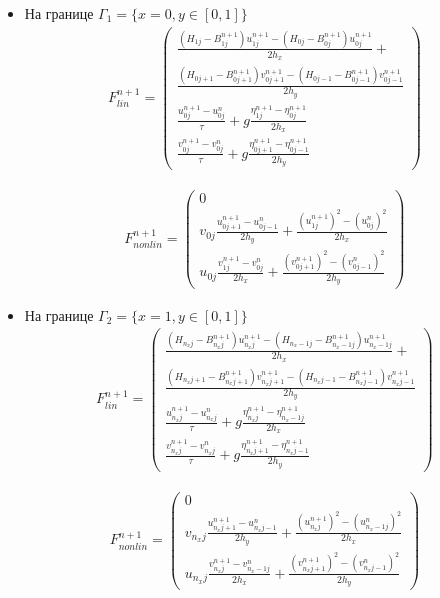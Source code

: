 \begin{itemize}

    \item На границе $\Gamma_1=\{x=0,y\in[0,1]\}$
	\begin{eqnarray}
	    \label{eq:ApproxFLinGamma1}
	    F^{n+1}_{lin}=\begin{pmatrix}
		\frac{(H_{1j}-B_{1j}^{n+1})u_{1j}^{n+1}-(H_{0j}-B_{0j}^{n+1})u_{0j}^{n+1}}{2h_x}+\\
		\frac{(H_{0j+1}-B_{0j+1}^{n+1})v_{0j+1}^{n+1}-(H_{0j-1}-B_{0j-1}^{n+1})v_{0j-1}^{n+1}}{2h_y}\\
		\frac{u_{0j}^{n+1}-u_{0j}^{n}}{\tau}+
		g\frac{\eta_{1j}^{n+1}-\eta_{0j}^{n+1}}{2h_x}\\
		\frac{v_{0j}^{n+1}-v_{0j}^{n}}{\tau}+
		g\frac{\eta_{0j+1}^{n+1}-\eta_{0j-1}^{n+1}}{2h_y}
	    \end{pmatrix}
	\end{eqnarray}

	\begin{eqnarray}
	    \label{eq:ApproxFNonlinGamma1}
	    F^{n+1}_{nonlin}=\begin{pmatrix}
		0\\
		v_{0j}\frac{u_{0j+1}^{n+1}-u_{0j-1}^{n}}{2h_y}+
		\frac{(u_{1j}^{n+1})^2-(u_{0j}^{n})^2}{2h_x}\\
		u_{0j}\frac{v_{1j}^{n+1}-v_{0j}^{n}}{2h_x}+
		\frac{(v_{0j+1}^{n+1})^2-(v_{0j-1}^{n})^2}{2h_y}
	    \end{pmatrix}
	\end{eqnarray}

    \item На границе $\Gamma_2=\{x=1,y\in[0,1]\}$
	\begin{eqnarray}
	    \label{eq:ApproxFLinGamma2}
	    F^{n+1}_{lin}=\begin{pmatrix}
		\frac{(H_{n_{x}j}-B_{n_{x}j}^{n+1})u_{n_{x}j}^{n+1}-(H_{n_{x}-1j}-B_{n_{x}-1j}^{n+1})u_{n_{x}-1j}^{n+1}}{2h_x}+\\
		\frac{(H_{n_{x}j+1}-B_{n_{x}j+1}^{n+1})v_{n_{x}j+1}^{n+1}-(H_{n_{x}j-1}-B_{n_{x}j-1}^{n+1})v_{n_{x}j-1}^{n+1}}{2h_y}\\
		\frac{u_{n_{x}j}^{n+1}-u_{n_{x}j}^{n}}{\tau}+
		g\frac{\eta_{n_{x}j}^{n+1}-\eta_{n_{x}-1j}^{n+1}}{2h_x}\\
		\frac{v_{n_{x}j}^{n+1}-v_{n_{x}j}^{n}}{\tau}+
		g\frac{\eta_{n_{x}j+1}^{n+1}-\eta_{n_{x}j-1}^{n+1}}{2h_y}
	    \end{pmatrix}
	\end{eqnarray}

	\begin{eqnarray}
	    \label{eq:ApproxFNonlinGamma2}
	    F^{n+1}_{nonlin}=\begin{pmatrix}
		0\\
		v_{n_{x}j}\frac{u_{n_{x}j+1}^{n+1}-u_{n_{x}j-1}^{n}}{2h_y}+
		\frac{(u_{n_{x}j}^{n+1})^2-(u_{n_{x}-1j}^{n})^2}{2h_x}\\
		u_{n_{x}j}\frac{v_{n_{x}j}^{n+1}-v_{n_{x}-1j}^{n}}{2h_x}+
		\frac{(v_{n_{x}j+1}^{n+1})^2-(v_{n_{x}j-1}^{n})^2}{2h_y}
	    \end{pmatrix}
	\end{eqnarray}


\end{itemize}
